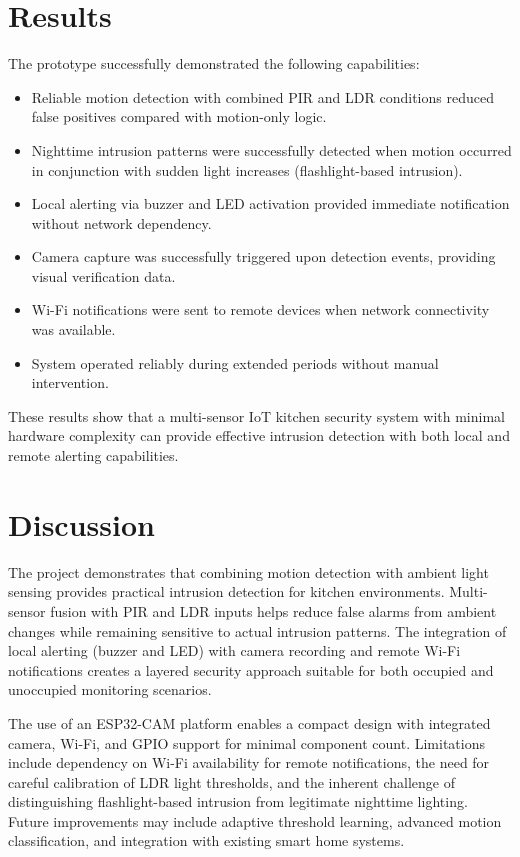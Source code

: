 \documentclass[conference]{IEEEtran}
\begin{document}
\section{Results}
The prototype successfully demonstrated the following capabilities:
\begin{itemize}
  \item Reliable motion detection with combined PIR and LDR conditions reduced false positives compared with motion-only logic.
  \item Nighttime intrusion patterns were successfully detected when motion occurred in conjunction with sudden light increases (flashlight-based intrusion).
  \item Local alerting via buzzer and LED activation provided immediate notification without network dependency.
  \item Camera capture was successfully triggered upon detection events, providing visual verification data.
  \item Wi-Fi notifications were sent to remote devices when network connectivity was available.
  \item System operated reliably during extended periods without manual intervention.
\end{itemize}

These results show that a multi-sensor IoT kitchen security system with minimal hardware complexity can provide effective intrusion detection with both local and remote alerting capabilities.

\section{Discussion}
The project demonstrates that combining motion detection with ambient light sensing provides practical intrusion detection for kitchen environments. Multi-sensor fusion with PIR and LDR inputs helps reduce false alarms from ambient changes while remaining sensitive to actual intrusion patterns. The integration of local alerting (buzzer and LED) with camera recording and remote Wi-Fi notifications creates a layered security approach suitable for both occupied and unoccupied monitoring scenarios.

The use of an ESP32-CAM platform enables a compact design with integrated camera, Wi-Fi, and GPIO support for minimal component count. Limitations include dependency on Wi-Fi availability for remote notifications, the need for careful calibration of LDR light thresholds, and the inherent challenge of distinguishing flashlight-based intrusion from legitimate nighttime lighting. Future improvements may include adaptive threshold learning, advanced motion classification, and integration with existing smart home systems.
\end{document}
